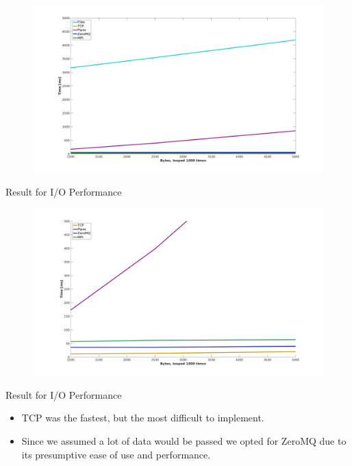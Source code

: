 \documentclass{beamer}
\begin{document}
    \begin{frame}
    \begin{figure}[h!]
        \centering
        \includegraphics[width=1\columnwidth]{thousandrun+files-nf}
    \end{figure}
    \end{frame}
    \begin{frame}{Result for I/O Performance}
    \begin{figure}[h!]
        \centering
        \includegraphics[width=1\columnwidth]{thousandrun-nf}
    \end{figure}
    \end{frame}
    \begin{frame}{Result for I/O Performance}
    \begin{itemize}[<+-|alert@+>]
        \item TCP was the fastest, but the most difficult to implement.
        \item Since we assumed a lot of data would be passed we opted for ZeroMQ
              due to its presumptive ease of use and performance.
    \end{itemize}
    \end{frame}
\end{document}
